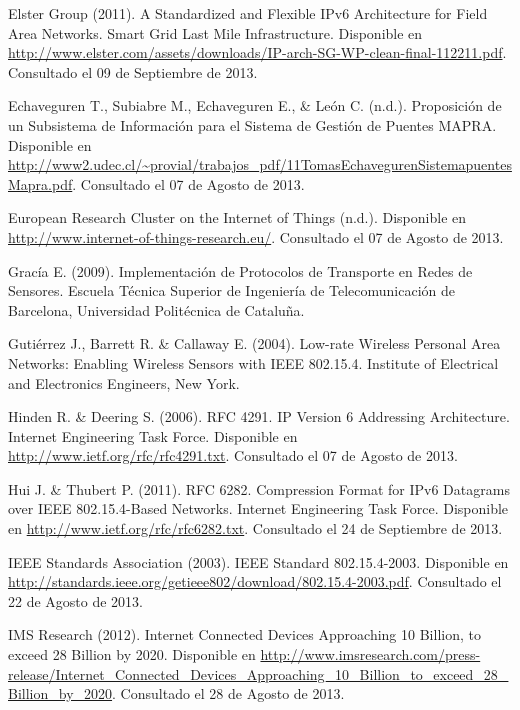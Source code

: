\begin{spacing}{1.0}
\begin{thebibliography}{99}
Elster Group (2011).
\newblock A Standardized and Flexible IPv6 Architecture for Field Area Networks.
\newblock Smart Grid Last Mile Infrastructure.
\newblock Disponible en \url{http://www.elster.com/assets/downloads/IP-arch-SG-WP-clean-final-112211.pdf}.
\newblock Consultado el 09 de Septiembre de 2013.

Echaveguren T., Subiabre M., Echaveguren E., \& León C. (n.d.).
\newblock Proposición de un Subsistema de Información para el Sistema de Gestión de Puentes MAPRA.
\newblock Disponible en \url{http://www2.udec.cl/~provial/trabajos_pdf/11TomasEchavegurenSistemapuentesMapra.pdf}.
\newblock Consultado el 07 de Agosto de 2013.

European Research Cluster on the Internet of Things (n.d.).
\newblock Disponible en \url{http://www.internet-of-things-research.eu/}.
\newblock Consultado el 07 de Agosto de 2013.

Gracía E. (2009).
\newblock Implementación de Protocolos de Transporte en Redes de Sensores.
\newblock Escuela Técnica Superior de Ingeniería de Telecomunicación de Barcelona,
\newblock Universidad Politécnica de Cataluña.

Gutiérrez J., Barrett R. \& Callaway E. (2004).
\newblock Low-rate Wireless Personal Area Networks: Enabling Wireless Sensors with IEEE 802.15.4.
\newblock Institute of Electrical and Electronics Engineers, New York.

Hinden R. \& Deering S. (2006).
\newblock RFC 4291. IP Version 6 Addressing Architecture. Internet Engineering Task Force.
\newblock Disponible en \url{http://www.ietf.org/rfc/rfc4291.txt}.
\newblock Consultado el 07 de Agosto de 2013.

Hui J. \& Thubert P. (2011).
\newblock RFC 6282. Compression Format for IPv6 Datagrams over IEEE 802.15.4-Based Networks. Internet Engineering Task Force.
\newblock Disponible en \url{http://www.ietf.org/rfc/rfc6282.txt}.
\newblock Consultado el 24 de Septiembre de 2013.

IEEE Standards Association (2003).
\newblock IEEE Standard 802.15.4-2003.
\newblock Disponible en \url{http://standards.ieee.org/getieee802/download/802.15.4-2003.pdf}.
\newblock Consultado el 22 de Agosto de 2013.

IMS Research (2012).
\newblock Internet Connected Devices Approaching 10 Billion, to exceed 28 Billion by 2020.
\newblock Disponible en \url{http://www.imsresearch.com/press-release/Internet_Connected_Devices_Approaching_10_Billion_to_exceed_28_Billion_by_2020}.
\newblock Consultado el 28 de Agosto de 2013.


\end{thebibliography}
\end{spacing}

